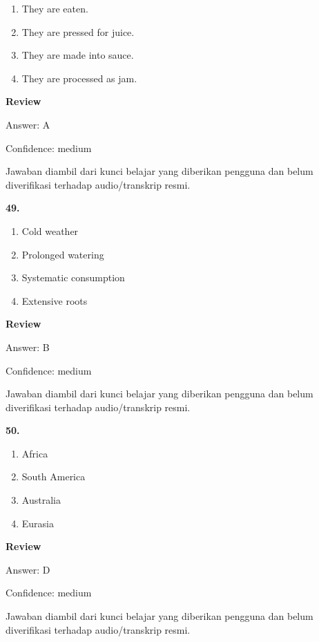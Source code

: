 \documentclass[12pt]{article}
\begin{document}
\begin{enumerate}[label=(\Alph*),leftmargin=*,itemsep=0.2em]
\item They are eaten.
\item They are pressed for juice.
\item They are made into sauce.
\item They are processed as jam.
\end{enumerate}
\par
\begingroup
\setlength{\parskip}{0pt}
\setlength{\parindent}{0pt}
\textbf{Review}\par
Answer: A\par
Confidence: medium\par
Jawaban diambil dari kunci belajar yang diberikan pengguna dan belum diverifikasi terhadap audio/transkrip resmi.\par
\endgroup
\par
\vspace{0.25\baselineskip}
\noindent\textbf{49.}
\begin{enumerate}[label=(\Alph*),leftmargin=*,itemsep=0.2em]
\item Cold weather
\item Prolonged watering
\item Systematic consumption
\item Extensive roots
\end{enumerate}
\par
\begingroup
\setlength{\parskip}{0pt}
\setlength{\parindent}{0pt}
\textbf{Review}\par
Answer: B\par
Confidence: medium\par
Jawaban diambil dari kunci belajar yang diberikan pengguna dan belum diverifikasi terhadap audio/transkrip resmi.\par
\endgroup
\par
\vspace{0.25\baselineskip}
\noindent\textbf{50.}
\begin{enumerate}[label=(\Alph*),leftmargin=*,itemsep=0.2em]
\item Africa
\item South America
\item Australia
\item Eurasia
\end{enumerate}
\par
\begingroup
\setlength{\parskip}{0pt}
\setlength{\parindent}{0pt}
\textbf{Review}\par
Answer: D\par
Confidence: medium\par
Jawaban diambil dari kunci belajar yang diberikan pengguna dan belum diverifikasi terhadap audio/transkrip resmi.\par
\endgroup
\par
\vspace{0.25\baselineskip}
\end{document}
